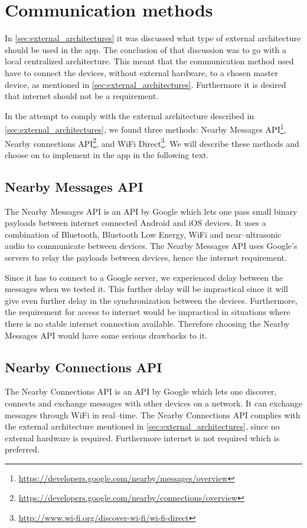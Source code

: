 \section{Communication methods}\label{sec:communication_methods}
In \cref{sec:external_architectures} it was discussed what type of external architecture should be used in the app.
The conclusion of that discussion was to go with a local centralized architecture.
This meant that the communication method used have to connect the devices, without external hardware, to a chosen master device, as mentioned in \cref{sec:external_architectures}.
Furthermore it is desired that internet should not be a requirement.

In the attempt to comply with the external architecture described in \cref{sec:external_architectures}, we found three methods: Nearby Messages API\footnote{\url{https://developers.google.com/nearby/messages/overview}}, Nearby connections API\footnote{\url{https://developers.google.com/nearby/connections/overview}}, and WiFi Direct\footnote{\url{http://www.wi-fi.org/discover-wi-fi/wi-fi-direct}}.
We will describe these methods and choose on to implement in the app in the following text.

\subsection{Nearby Messages API}
The Nearby Messages API is an API by Google which lets one pass small binary payloads between internet connected Android and iOS devices.
It uses a combination of Bluetooth, Bluetooth Low Energy, WiFi and near--ultrasonic audio to communicate between devices.
The Nearby Messages API uses Google's servers to relay the payloads between devices, hence the internet requirement.\cite{nearby_messages}

Since it has to connect to a Google server, we experienced delay between the messages when we tested it.
This further delay will be impractical since it will give even further delay in the synchronization between the devices.
Furthermore, the requirement for access to internet would be impractical in situations where there is no stable internet connection available.
Therefore choosing the Nearby Messages API would have some serious drawbacks to it.

\subsection{Nearby Connections API}
The Nearby Connections API is an API by Google which lets one discover, connects and exchange messages with other devices on a network.
It can exchange messages through WiFi in real--time.\cite{nearby_connection}
The Nearby Connections API complies with the external architecture mentioned in \cref{sec:external_architectures},
since no external hardware is required.
Furthermore internet is not required which is preferred.

